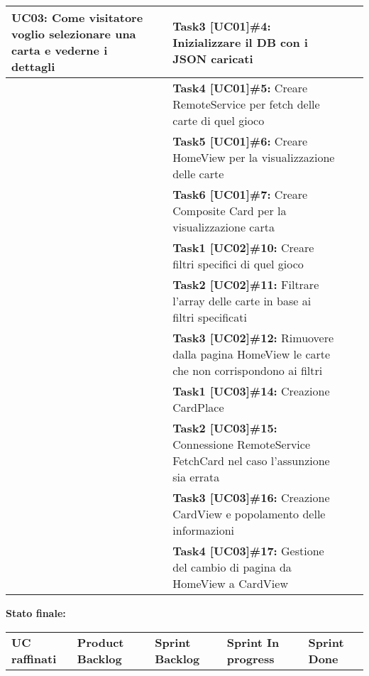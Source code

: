 \documentclass{article}
\begin{document}
\begin{itemize}
\begin{tabular}{ | p{3.5cm} | p{1.5cm} | p{5cm} | p{1.6cm} | p{1.6cm} | }
            \hline
            \textbf{UC03:} Come visitatore voglio selezionare una carta e vederne i dettagli
            & & \textbf{Task3 [UC01]\#4:} Inizializzare il DB con i JSON caricati                                   & & \\
            \hline
            & & \textbf{Task4 [UC01]\#5:} Creare RemoteService per fetch delle carte di quel gioco & & \\
            \hline
            & & \textbf{Task5 [UC01]\#6:} Creare HomeView per la visualizzazione delle carte                        & & \\
            \hline
            & & \textbf{Task6 [UC01]\#7:} Creare Composite Card per la visualizzazione carta                        & & \\
            \hline
            & & \textbf{Task1 [UC02]\#10:} Creare filtri specifici di quel gioco                                    & & \\
            \hline
            & & \textbf{Task2 [UC02]\#11:} Filtrare l'array delle carte in base ai filtri specificati & & \\
            \hline
            & & \textbf{Task3 [UC02]\#12:} Rimuovere dalla pagina HomeView le carte che non corrispondono ai filtri & & \\
            \hline
            & & \textbf{Task1 [UC03]\#14:} Creazione CardPlace                                                      & & \\
            \hline
            & & \textbf{Task2 [UC03]\#15:} Connessione RemoteService FetchCard nel caso l'assunzione sia errata & & \\
            \hline
            & & \textbf{Task3 [UC03]\#16:} Creazione CardView e popolamento delle informazioni & & \\
            \hline
            & & \textbf{Task4 [UC03]\#17:} Gestione del cambio di pagina da HomeView a CardView & & \\
            \hline
        \end{tabular}
        \newpage
        \textbf{Stato finale:}
        \newline
        \newline
        \begin{tabular}{ | p{2.4cm} | p{1.4cm} | p{2.7cm} | p{3.4cm} | p{3cm} | }
            \hline
            \textbf{UC raffinati}
            & \textbf{Product Backlog}
            & \textbf{Sprint Backlog}
            & \textbf{Sprint In progress}
            & \textbf{Sprint Done} \\

\end{tabular}
\end{itemize}
\end{document}
